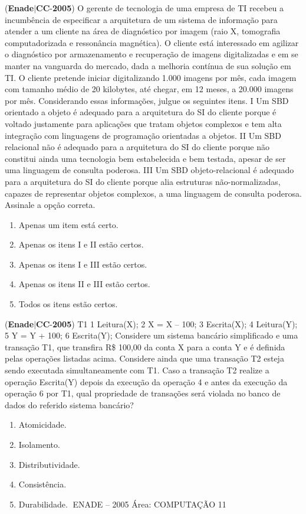 \documentclass{exam}
\begin{document}
\begin{questions}
\begin{enumerate}[label=\alph*)]
	\end{enumerate}

\question (\textbf{Enade}$|$\textbf{CC}-\textbf{2005}) O gerente de tecnologia de uma empresa de TI
recebeu a incumbência de especificar a arquitetura de um
sistema de informação para atender a um cliente na área de
diagnóstico por imagem (raio X, tomografia computadorizada
e ressonância magnética). O cliente está interessado em
agilizar o diagnóstico por armazenamento e recuperação de
imagens digitalizadas e em se manter na vanguarda do
mercado, dada a melhoria contínua de sua solução em TI.
O cliente pretende iniciar digitalizando 1.000 imagens por
mês, cada imagem com tamanho médio de 20 kilobytes, até
chegar, em 12 meses, a 20.000 imagens por mês.
Considerando essas informações, julgue os seguintes itens.
I Um SBD orientado a objeto é adequado para a arquitetura do SI
do cliente porque é voltado justamente para aplicações que
tratam objetos complexos e tem alta integração com linguagens
de programação orientadas a objetos.
II Um SBD relacional não é adequado para a arquitetura do SI do
cliente porque não constitui ainda uma tecnologia bem
estabelecida e bem testada, apesar de ser uma linguagem de
consulta poderosa.
III Um SBD objeto-relacional é adequado para a arquitetura do SI
do cliente porque alia estruturas não-normalizadas, capazes de
representar objetos complexos, a uma linguagem de consulta
poderosa.
Assinale a opção correta.
	\begin{enumerate}[label=\alph*)]
		\item  Apenas um item está certo.
		\item  Apenas os itens I e II estão certos.
		\item  Apenas os itens I e III estão certos.
		\item  Apenas os itens II e III estão certos.
		\item  Todos os itens estão certos.

	\end{enumerate}

\question (\textbf{Enade}$|$\textbf{CC}-\textbf{2005}) T1
1 Leitura(X);
2 X = X – 100;
3 Escrita(X);
4 Leitura(Y);
5 Y = Y + 100;
6 Escrita(Y);
Considere um sistema bancário simplificado e uma transação T1,
que transfira R\$ 100,00 da conta X para a conta Y e é definida
pelas operações listadas acima. Considere ainda que uma transação
T2 esteja sendo executada simultaneamente com T1. Caso a
transação T2 realize a operação Escrita(Y) depois da execução
da operação 4 e antes da execução da operação 6 por T1, qual
propriedade de transações será violada no banco de dados do
referido sistema bancário?
	\begin{enumerate}[label=\alph*)]
		\item  Atomicidade.
		\item  Isolamento.
		\item  Distributividade.
		\item  Consistência.
		\item  Durabilidade.
ENADE – 2005 Área: COMPUTAÇÃO 11


\end{enumerate}
\end{questions}
\end{document}
